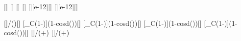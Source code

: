 [\degree]
[\degree]
[\degree]
[\degree]
[\pico\m][e-12][\m]
[\pico\m][e-12][\m]

[]{\nchX/(\ncmeX*\nccX)}[\m]
[\lambda_C\left(1-\cos\theta\right)]{\lCX*(1-cosd(\angaX))}[\m]
[\lambda_C\left(1-\cos\theta\right)]{\lCX*(1-cosd(\angbX))}[\m]
[\lambda_C\left(1-\cos\theta\right)]{\lCX*(1-cosd(\angcX))}[\m]
[\lambda_C\left(1-\cos\theta\right)]{\lCX*(1-cosd(\angdX))}[\m]
[]{\dlcX/(\lxX+\dlcX)}
[\frac{\Delta\lambda}{\lambda_\gamma+\Delta\lambda}]{\dlcX/(\lgmX+\dlcX)}
